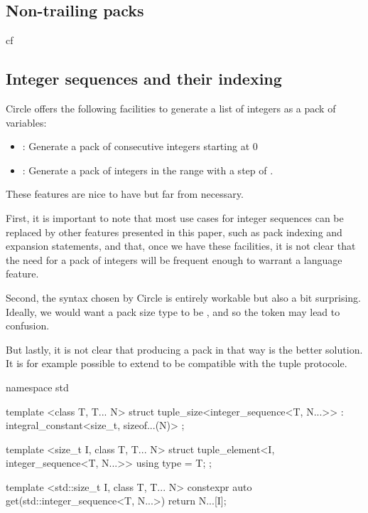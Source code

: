 \documentclass{wg21}
\begin{document}

\subsection{Non-trailing packs}

cf 


\subsection{Integer sequences and their indexing}

Circle offers the following facilities to generate a list of integers as a pack of variables:

\begin{itemize}
\item {} : Generate a pack of  consecutive integers starting at 0
\item {} : Generate a pack of integers in the range  with a step of .
\end{itemize}

These features are nice to have but far from necessary.

First, it is important to note that most use cases for integer sequences can be replaced by other features presented in this paper,
such as pack indexing and expansion statements, and that, once we have these facilities, it is not clear that the need for a
pack of integers will be frequent enough to warrant a language feature.

Second, the syntax chosen by Circle is entirely workable but also a bit surprising.
Ideally, we would want a pack size type to be , and so the token  may lead to confusion.

But lastly, it is not clear that producing a pack in that way is the better solution.
It is for example possible to extend  to be compatible with the tuple protocole.

\begin{colorblock}
namespace std {
    template <class T, T... N>
    struct tuple_size<integer_sequence<T, N...>>
    : integral_constant<size_t, sizeof...(N)>
    { };

    template <size_t I,  class T, T... N>
    struct tuple_element<I, integer_sequence<T, N...>> {
        using type = T;
    };

    template <std::size_t I,  class T, T... N>
    constexpr auto get(std::integer_sequence<T, N...>) {
        return N...[I];
    }
}
\end{colorblock}
\end{document}
